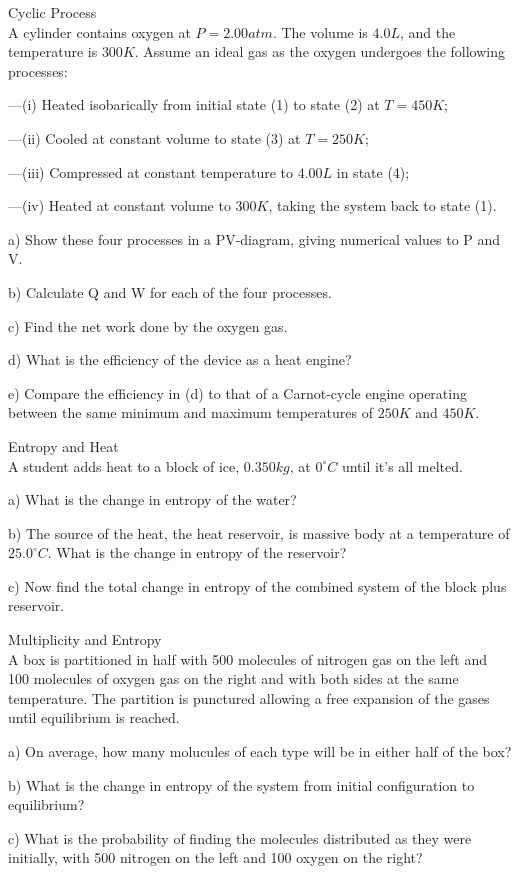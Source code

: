 \documentclass[10pt]{article}
\newenvironment{problem}[2][Problem]{\begin{trivlist}
\item[\hskip \labelsep {\bfseries #1}\hskip \labelsep {\bfseries #2.}]}{\end{trivlist}}
\begin{document}
\begin{problem}{4} Cyclic Process\\
A cylinder contains oxygen at $P=2.00atm$. The volume is $4.0L$, and the temperature is $300K$. Assume an ideal gas as the oxygen undergoes the following processes:
\item ---(i) Heated isobarically from initial state (1) to state (2) at $T=450K$;
\item ---(ii) Cooled at constant volume to state (3) at $T=250K$;
\item ---(iii) Compressed at constant temperature to $4.00L$ in state (4);
\item ---(iv) Heated at constant volume to $300K$, taking the system back to state (1).

\item a) Show these four processes in a PV-diagram, giving numerical values to P and V.
\item b) Calculate Q and W for each of the four processes.
\item c) Find the net work done by the oxygen gas.
\item d) What is the efficiency of the device as a heat engine?
\item e) Compare the efficiency in (d) to that of a Carnot-cycle engine operating between the same minimum and maximum temperatures of $250K$ and $450K$.
\end{problem}

\newpage

\begin{problem}{5} Entropy and Heat\\
A student adds heat to a block of ice, $0.350kg$, at $0^\circ C$ until it's all melted.
\item a) What is the change in entropy of the water?
\item b) The source of the heat, the heat reservoir, is massive body at a temperature of $25.0^\circ C$. What is the change in entropy of the reservoir?
\item c) Now find the total change in entropy of the combined system of the block plus reservoir.
\end{problem}

\begin{problem}{6} Multiplicity and Entropy\\
A box is partitioned in half with 500 molecules of nitrogen gas on the left and 100 molecules of oxygen gas on the right and with both sides at the same temperature. The partition is punctured allowing a free expansion of the gases until equilibrium is reached.
\item a) On average, how many molucules of each type will be in either half of the box?
\item b) What is the change in entropy of the system from initial configuration to equilibrium?
\item c) What is the probability of finding the molecules distributed as they were initially, with 500 nitrogen on the left and 100 oxygen on the right?
\end{problem}

\end{document}
